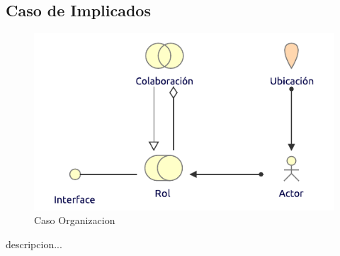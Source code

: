 \newpage

\subsection{Caso  de Implicados}
\begin{figure}[h!]
	\centering
	\includegraphics[width=.5\linewidth]{imgs/caso/Organizacion}
	\caption{Caso Organizacion}
\end{figure}
descripcion...

\newpage